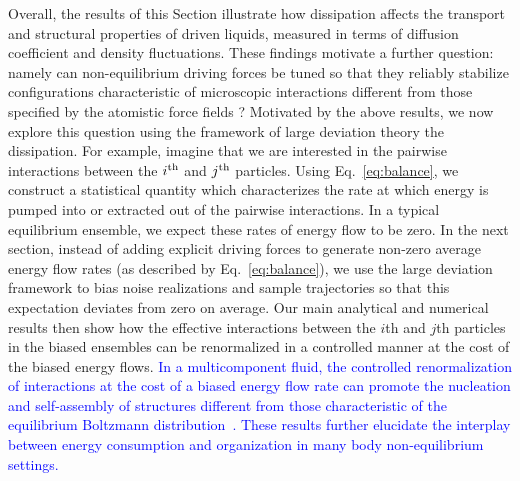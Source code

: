 \documentclass[superscriptaddress, twocolumn, prx, longbibliography, nofootinbib]{revtex4-1}
\newcommand{\tn}[1]{{\color{red}#1}}
\begin{document}
{Overall, the results of this Section illustrate how dissipation affects the transport and structural properties of driven liquids, measured in terms of diffusion coefficient and density fluctuations. These findings motivate a further question: namely can non-equilibrium driving forces be tuned so that they reliably stabilize configurations characteristic of microscopic interactions different from those specified by the atomistic force fields ?}
{Motivated by the above results, we now explore this question using the framework of large deviation theory} 
\tn{the dissipation. For example, imagine that we are interested in the pairwise interactions between the $i^{\rm th}$ and $j^{\rm th}$ particles. Using Eq.~\ref{eq:balance}, we construct a statistical quantity which characterizes the rate at which energy is pumped into or extracted out of the pairwise interactions. In a typical equilibrium ensemble, we expect these rates of energy flow to be zero. In the next section, instead of adding explicit driving forces to generate non-zero average energy flow rates (as described by Eq.~\ref{eq:balance}), we use the large deviation framework to bias noise realizations and sample trajectories so that this expectation deviates from zero on average.  Our main analytical and numerical results then show how the  effective interactions between the $i$th and $j$th particles in the biased ensembles can be renormalized in a controlled manner at the cost of the biased energy flows.}
\textcolor{blue}{ In a multicomponent fluid, the controlled renormalization of interactions at the cost of a biased energy flow rate can promote the nucleation and self-assembly of structures different from those characteristic of the equilibrium Boltzmann distribution~\cite{Bisker2018}. These results further elucidate the interplay between energy consumption and organization in many body non-equilibrium settings.}


\end{document}
